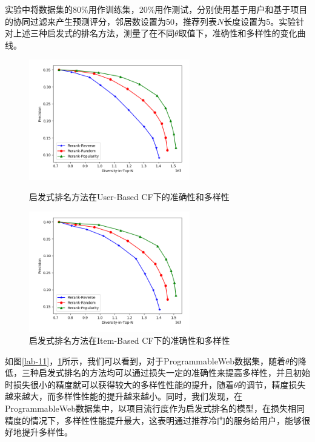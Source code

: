 \documentclass[master,winfonts]{njuthesis}
\begin{document}
实验中将数据集的80$\%$用作训练集，20\%用作测试，分别使用基于用户和基于项目的协同过滤来产生预测评分，邻居数设置为50，推荐列表$N$长度设置为5。实验针对上述三种启发式的排名方法，测量了在不同$\theta$取值下，准确性和多样性的变化曲线。
\begin{figure}[htbp]
\centering
\begin{minipage}[t]{0.48\textwidth}
\centering
\includegraphics[width=7cm]{diversity_1.png}
\caption{启发式排名方法在User-Based CF下的准确性和多样性}\label{lab-11}
\end{minipage}
\begin{minipage}[t]{0.48\textwidth}
\centering
\includegraphics[width=7cm]{diversity_2.png}
\caption{启发式排名方法在Item-Based CF下的准确性和多样性}\label{lab-12}
\end{minipage}
\end{figure}

如图\ref{lab-11}，\ref{lab-12}所示，我们可以看到，对于ProgrammableWeb数据集，随着$\theta$的降低，三种启发式排名的方法均可以通过损失一定的准确性来提高多样性，并且初始时损失很小的精度就可以获得较大的多样性性能的提升，随着$\theta$的调节，精度损失越来越大，而多样性性能的提升越来越小。同时，我们发现，在ProgrammableWeb数据集中，以项目流行度作为启发式排名的模型，在损失相同精度的情况下，多样性性能提升最大，这表明通过推荐冷门的服务给用户，能够很好地提升多样性。
\end{document}
